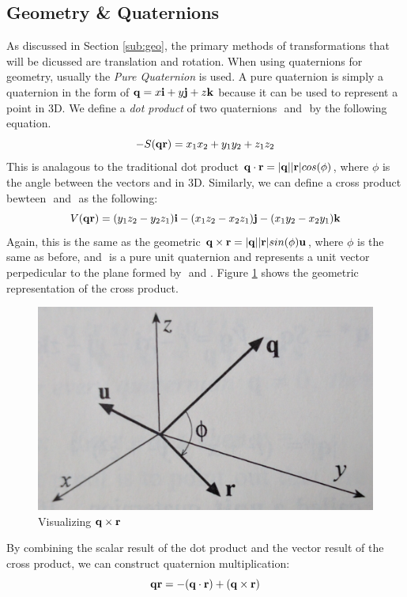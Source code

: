 \subsection{Geometry \& Quaternions}
As discussed in Section \ref{sub:geo}, the primary methods of transformations that will be dicussed are translation and rotation.
When using quaternions for geometry, usually the \textit{Pure Quaternion} is used. \cite{moderngeometries}
A pure quaternion is simply a quaternion in the form of $\text{\textbf{q}} = x\text{\textbf{i}} + y\text{\textbf{j}} + z\text{\textbf{k}}$ because it can be used to represent a point in 3D.
We define a \textit{dot product} of two quaternions \qq$ $ and \qr$ $ by the following equation.
\begin{equation}
-S(\text{\textbf{q}}\text{\textbf{r}}) = x_1x_2 + y_1y_2 + z_1z_2
\end{equation}
This is analagous to the traditional dot product $\text{\textbf{q}} \cdot \text{\textbf{r}} = \lvert\text{\textbf{q}}\rvert\lvert\text{\textbf{r}}\rvert cos(\phi)$, where $\phi$ is the angle between the vectors \qq and \qr in 3D.
Similarly, we can define a cross product bewteen \qq$ $ and \qr$ $ as the following:
\begin{equation}
V(\text{\textbf{q}}\text{\textbf{r}}) = (y_1z_2 - y_2z_1)\text{\textbf{i}} - (x_1z_2 - x_2z_1)\text{\textbf{j}} -(x_1y_2-x_2y_1)\text{\textbf{k}}
\end{equation}
Again, this is the same as the geometric $\text{\textbf{q}} \times \text{\textbf{r}} = \lvert\text{\textbf{q}}\rvert\lvert\text{\textbf{r}}\rvert sin(\phi)\text{\textbf{u}}$, where $\phi$ is the same as before, and \qu$ $ is a pure unit quaternion and represents a unit vector perpedicular to the plane formed by \qq$ $ and \qr.
Figure \ref{fig:cross} shows the geometric representation of the cross product.

\begin{figure}[H]
\centering
\includegraphics[width = .75\textwidth]{Figures/cross_product}
\caption{Visualizing $\text{\textbf{q}} \times \text{\textbf{r}}$}
\label{fig:cross}
\end{figure}

By combining the scalar result of the dot product and the vector result of the cross product, we can construct quaternion multiplication:
\begin{equation}
\label{eq:mult}
\text{\textbf{q}}\text{\textbf{r}} = -(\text{\textbf{q}} \cdot \text{\textbf{r}}) + (\text{\textbf{q}} \times \text{\textbf{r}})
\end{equation}

